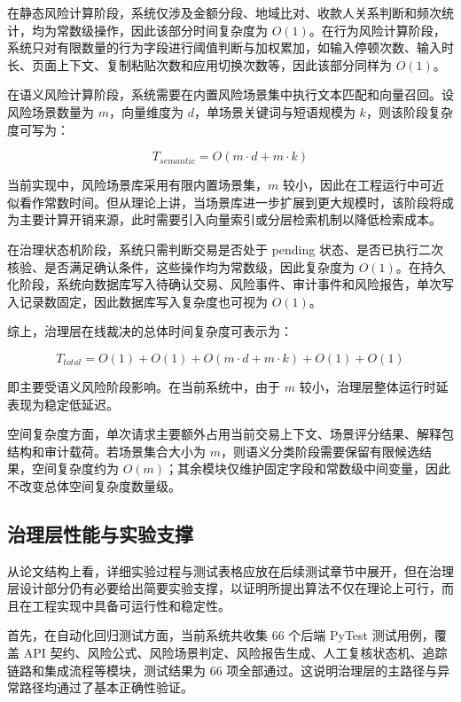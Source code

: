 \documentclass{xduugthesis}
\begin{document}
在静态风险计算阶段，系统仅涉及金额分段、地域比对、收款人关系判断和频次统计，均为常数级操作，因此该部分时间复杂度为 $O(1)$。在行为风险计算阶段，系统只对有限数量的行为字段进行阈值判断与加权累加，如输入停顿次数、输入时长、页面上下文、复制粘贴次数和应用切换次数等，因此该部分同样为 $O(1)$。

在语义风险计算阶段，系统需要在内置风险场景集中执行文本匹配和向量召回。设风险场景数量为 $m$，向量维度为 $d$，单场景关键词与短语规模为 $k$，则该阶段复杂度可写为：

\begin{equation}
T_{semantic} = O(m \cdot d + m \cdot k)
\end{equation}

当前实现中，风险场景库采用有限内置场景集，$m$ 较小，因此在工程运行中可近似看作常数时间。但从理论上讲，当场景库进一步扩展到更大规模时，该阶段将成为主要计算开销来源，此时需要引入向量索引或分层检索机制以降低检索成本。

在治理状态机阶段，系统只需判断交易是否处于 pending 状态、是否已执行二次核验、是否满足确认条件，这些操作均为常数级，因此复杂度为 $O(1)$。在持久化阶段，系统向数据库写入待确认交易、风险事件、审计事件和风险报告，单次写入记录数固定，因此数据库写入复杂度也可视为 $O(1)$。

综上，治理层在线裁决的总体时间复杂度可表示为：

\begin{equation}
T_{total} = O(1) + O(1) + O(m \cdot d + m \cdot k) + O(1) + O(1)
\end{equation}

即主要受语义风险阶段影响。在当前系统中，由于 $m$ 较小，治理层整体运行时延表现为稳定低延迟。

空间复杂度方面，单次请求主要额外占用当前交易上下文、场景评分结果、解释包结构和审计载荷。若场景集合大小为 $m$，则语义分类阶段需要保留有限候选结果，空间复杂度约为 $O(m)$；其余模块仅维护固定字段和常数级中间变量，因此不改变总体空间复杂度数量级。

\subsection{治理层性能与实验支撑}

从论文结构上看，详细实验过程与测试表格应放在后续测试章节中展开，但在治理层设计部分仍有必要给出简要实验支撑，以证明所提出算法不仅在理论上可行，而且在工程实现中具备可运行性和稳定性。

首先，在自动化回归测试方面，当前系统共收集 66 个后端 PyTest 测试用例，覆盖 API 契约、风险公式、风险场景判定、风险报告生成、人工复核状态机、追踪链路和集成流程等模块，测试结果为 66 项全部通过。这说明治理层的主路径与异常路径均通过了基本正确性验证。
\end{document}
